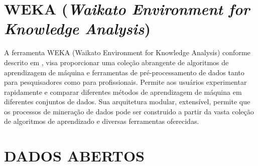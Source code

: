 \documentclass[
	12pt,				%
	openright,			%
	oneside,	
	a4paper,				%
	english,				%
	brazil				%
]{abntex2/abntex2} %
\begin{document}
		

	\section{WEKA (\textit{Waikato Environment for Knowledge Analysis})}
	
	A ferramenta WEKA (Waikato Environment for Knowledge Analysis)  conforme descrito em \cite{hall:2009}, visa proporcionar uma coleção abrangente de algoritmos de aprendizagem de máquina e ferramentas de pré-processamento de dados tanto para pesquisadores como para profissionais. Permite aos usuários experimentar rapidamente e comparar diferentes métodos de aprendizagem de máquina em diferentes conjuntos de dados. Sua arquitetura modular, extensível, permite que os processos de mineração de dados pode ser construido a partir da vasta coleção de algoritmos de aprendizado e diversas ferramentas oferecidas.
		
	\section{DADOS ABERTOS}
\end{document}
